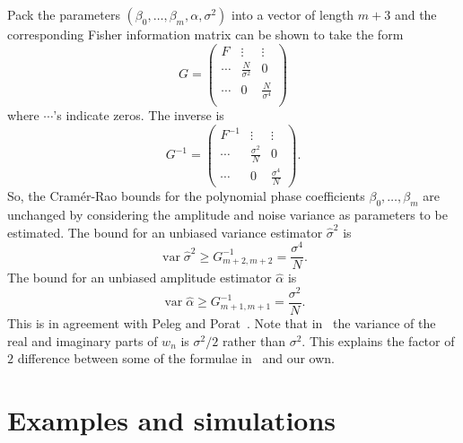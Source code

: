 \documentclass[review]{elsarticle}
\newcommand{\var}{\operatorname{var}}
\begin{document}
Pack the parameters $(\beta_0, \dots, \beta_m,\alpha,\sigma^2)$ into a vector of length $m+3$ and the corresponding Fisher information matrix can be shown to take the form
\[
G = \left( \begin{array}{ccc}
F & \vdots & \vdots \\
\cdots & \frac{N}{\sigma^2} & 0\\
\cdots & 0 & \frac{N}{\sigma^4} \\
\end{array}\right)
\]
where $\cdots$'s indicate zeros.  The inverse is
\[
G^{-1} = \left( \begin{array}{ccc}
F^{-1} & \vdots & \vdots \\
\cdots & \frac{\sigma^2}{N} & 0 \\
\cdots & 0 & \frac{\sigma^4}{N}
\end{array} \right).
\]
So, the Cram\'{e}r-Rao bounds for the polynomial phase coefficients $\beta_0, \dots, \beta_m$ are unchanged by considering the amplitude and noise variance as parameters to be estimated.  The bound for an unbiased variance estimator $\hat{\sigma}^2$ is
\[
\var \hat{\sigma}^2 \geq G_{m+2,m+2}^{-1} = \frac{\sigma^4}{N}.
\]
The bound for an unbiased amplitude estimator $\hat{\alpha}$ is
\[
\var \hat{\alpha} \geq G_{m+1,m+1}^{-1} = \frac{\sigma^2}{N}.
\]
This is in agreement with Peleg and Porat~\cite{Peleg1991_CRB_PPS_1991}.  Note that in~\cite{Peleg1991_CRB_PPS_1991} the variance of the real and imaginary parts of $w_n$ is $\sigma^2/2$ rather than $\sigma^2$.  This explains the factor of $2$ difference between some of the formulae in~\cite{Peleg1991_CRB_PPS_1991} and our own.

\section{Examples and simulations}\label{sec:simuations}
\end{document}
